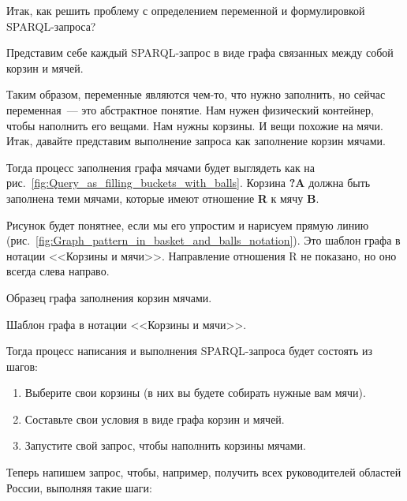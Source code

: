 Итак, как решить проблему с определением переменной и формулировкой SPARQL-запроса?

Представим себе каждый SPARQL-запрос в виде графа связанных между собой корзин и мячей.

Таким образом, переменные являются чем-то, что нужно заполнить, но сейчас переменная~--- это абстрактное понятие. Нам нужен физический контейнер, чтобы наполнить его вещами. Нам нужны корзины. И вещи похожие на мячи. Итак, давайте представим выполнение запроса как заполнение корзин мячами.

Тогда процесс заполнения графа мячами будет выглядеть как на рис.~\ref{fig:Query_as_filling_buckets_with_balls}. Корзина \textbf{?A} должна быть заполнена теми мячами, которые имеют отношение \textbf{R} к мячу \textbf{B}.

Рисунок будет понятнее, если мы его упростим и нарисуем прямую линию (рис.~\ref{fig:Graph_pattern_in_basket_and_balls_notation}). Это шаблон графа в нотации <<Корзины и мячи>>. Направление отношения R не показано, но оно всегда слева направо.

\begin{marginfigure}
	{
		\setlength{\fboxsep}{0pt}%
		\setlength{\fboxrule}{1pt}%
	}
    \caption{Образец графа заполнения корзин мячами.}
	\label{fig:Query_as_filling_buckets_with_balls}
\end{marginfigure}

\begin{marginfigure}[1cm]
	{
		\setlength{\fboxsep}{0pt}%
		\setlength{\fboxrule}{1pt}%
	}
    \caption{Шаблон графа в нотации <<Корзины и мячи>>.}
	\label{fig:Graph_pattern_in_basket_and_balls_notation}
\end{marginfigure}


Тогда процесс написания и выполнения SPARQL-запроса будет состоять из шагов:
\begin{enumerate}
    \item Выберите свои корзины (в них вы будете собирать нужные вам мячи).
    \item Составьте свои условия в виде графа корзин и мячей.
    \item Запустите свой запрос, чтобы наполнить корзины мячами.
\end{enumerate}

Теперь напишем запрос, чтобы, например, получить всех руководителей областей России, выполняя такие шаги:

